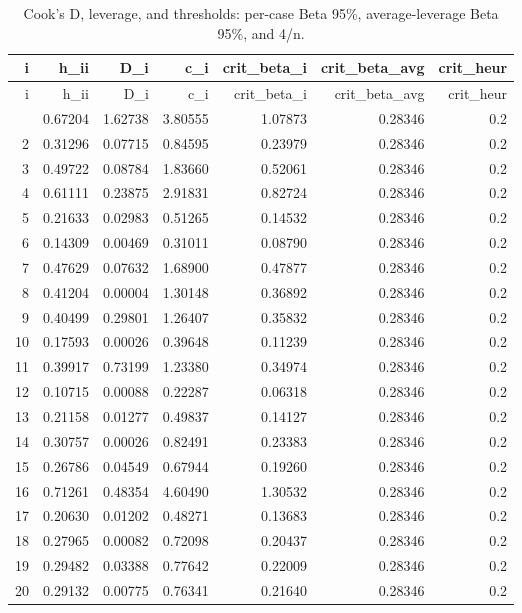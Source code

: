 \documentclass[
  letterpaper,
  DIV=11,
  numbers=noendperiod]{scrreprt}
\begin{document}
\begin{longtable}[]{@{}rrrrrrr@{}}
\caption{Cook's D, leverage, and thresholds: per-case Beta 95\%,
average-leverage Beta 95\%, and 4/n.}\tabularnewline
\toprule\noalign{}
i & h\_ii & D\_i & c\_i & crit\_beta\_i & crit\_beta\_avg &
crit\_heur \\
\midrule\noalign{}
\endfirsthead
\toprule\noalign{}
i & h\_ii & D\_i & c\_i & crit\_beta\_i & crit\_beta\_avg &
crit\_heur \\
\midrule\noalign{}
\endhead
\bottomrule\noalign{}
\endlastfoot
1 & 0.67204 & 1.62738 & 3.80555 & 1.07873 & 0.28346 & 0.2 \\
2 & 0.31296 & 0.07715 & 0.84595 & 0.23979 & 0.28346 & 0.2 \\
3 & 0.49722 & 0.08784 & 1.83660 & 0.52061 & 0.28346 & 0.2 \\
4 & 0.61111 & 0.23875 & 2.91831 & 0.82724 & 0.28346 & 0.2 \\
5 & 0.21633 & 0.02983 & 0.51265 & 0.14532 & 0.28346 & 0.2 \\
6 & 0.14309 & 0.00469 & 0.31011 & 0.08790 & 0.28346 & 0.2 \\
7 & 0.47629 & 0.07632 & 1.68900 & 0.47877 & 0.28346 & 0.2 \\
8 & 0.41204 & 0.00004 & 1.30148 & 0.36892 & 0.28346 & 0.2 \\
9 & 0.40499 & 0.29801 & 1.26407 & 0.35832 & 0.28346 & 0.2 \\
10 & 0.17593 & 0.00026 & 0.39648 & 0.11239 & 0.28346 & 0.2 \\
11 & 0.39917 & 0.73199 & 1.23380 & 0.34974 & 0.28346 & 0.2 \\
12 & 0.10715 & 0.00088 & 0.22287 & 0.06318 & 0.28346 & 0.2 \\
13 & 0.21158 & 0.01277 & 0.49837 & 0.14127 & 0.28346 & 0.2 \\
14 & 0.30757 & 0.00026 & 0.82491 & 0.23383 & 0.28346 & 0.2 \\
15 & 0.26786 & 0.04549 & 0.67944 & 0.19260 & 0.28346 & 0.2 \\
16 & 0.71261 & 0.48354 & 4.60490 & 1.30532 & 0.28346 & 0.2 \\
17 & 0.20630 & 0.01202 & 0.48271 & 0.13683 & 0.28346 & 0.2 \\
18 & 0.27965 & 0.00082 & 0.72098 & 0.20437 & 0.28346 & 0.2 \\
19 & 0.29482 & 0.03388 & 0.77642 & 0.22009 & 0.28346 & 0.2 \\
20 & 0.29132 & 0.00775 & 0.76341 & 0.21640 & 0.28346 & 0.2 \\
\end{longtable}
\end{document}
